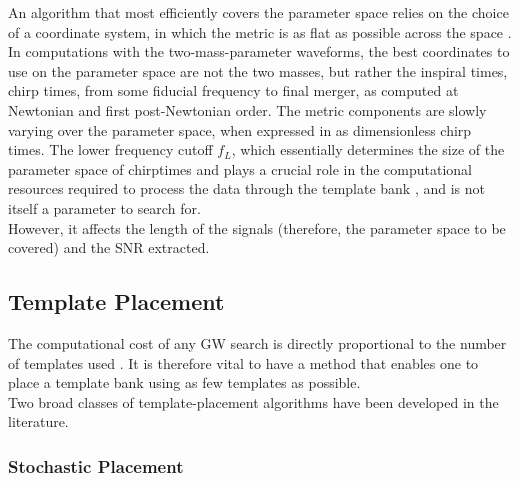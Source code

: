 \documentclass[binding=0.6cm, LaM]{sapthesis}
\begin{document}
	An algorithm that most efficiently covers the parameter space relies on the choice of a coordinate system, 
	in which the metric is as flat as possible across the space \cite{34}.
	In computations with the two-mass-parameter waveforms, 
	the best coordinates to use on the parameter space are not the two masses, 
	but rather the inspiral times, chirp times, from some fiducial frequency to final merger, 
	as computed at Newtonian and first post-Newtonian order. 
	The metric components are slowly varying over the parameter space, 
	when expressed in as dimensionless chirp times. 
        The lower frequency cutoff $f_L$, which essentially determines the size of the parameter space
        of chirptimes and plays a crucial role in the computational resources required
        to process the data through the template bank \cite{30}, and is not itself a parameter to search for. \\
        However, it affects the length of the signals
        (therefore, the parameter space to be covered) and the SNR extracted.

\subsection{Template Placement}

	The computational cost of any GW search
	 is directly proportional to the number of templates used \cite{28}.
	It is therefore vital to have a method that enables one 
	to place a template bank using as few templates as possible. \\ 
	Two broad classes of template-placement algorithms 
	have been developed in the literature. 

\subsubsection{Stochastic Placement}
\end{document}
